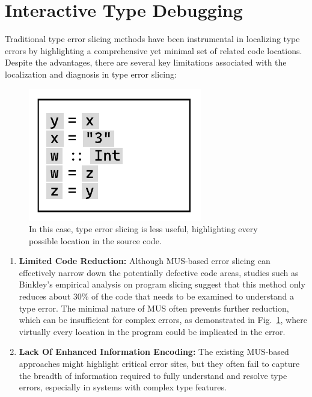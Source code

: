 \section{Interactive Type Debugging}

Traditional type error slicing methods have been instrumental in localizing type errors by highlighting a comprehensive yet minimal set of related code locations. Despite the advantages, there are several key limitations associated with the localization and diagnosis in type error slicing:

\begin{figure}[hbt]
  \centering
  \includegraphics[width=0.4\linewidth]{SlicingCounterExample}
  \caption[An example where type error slicing is less useful, highlighting every possible location in the source code]{
    \label{fig:slicing-counter-example}
      In this case, type error slicing is less useful, highlighting every possible location in the source code.}
\end{figure}

\begin{enumerate}
  \item {
    \textbf{Limited Code Reduction:} Although MUS-based error slicing can effectively narrow down the potentially defective code areas, studies such as Binkley's empirical analysis on program slicing \cite{Binkley2007-ev} suggest that this method only reduces about 30\% of the code that needs to be examined to understand a type error. The minimal nature of MUS often prevents further reduction, which can be insufficient for complex errors, as demonstrated in Fig.~\ref{fig:slicing-counter-example}, where virtually every location in the program could be implicated in the error.
  }

  \item{
    \textbf{Lack Of Enhanced Information Encoding:}  The existing MUS-based approaches might highlight critical error sites, but they often fail to capture the breadth of information required to fully understand and resolve type errors, especially in systems with complex type features.
  }
\end{enumerate}

